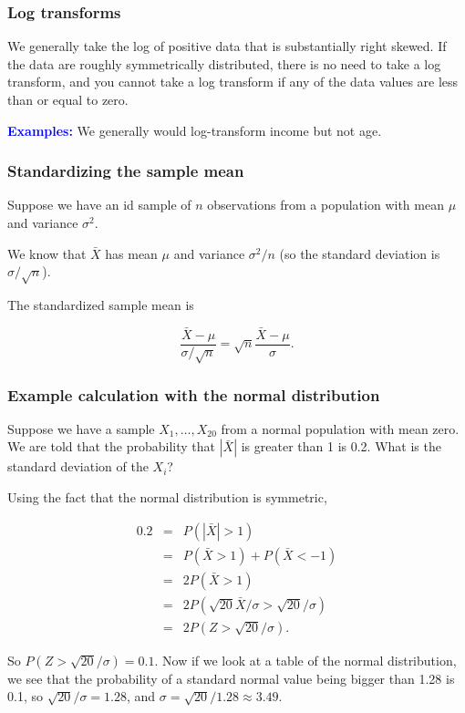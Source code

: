 \begin{frame}
\frametitle{Log transforms}

We generally take the log of positive data that is substantially right
skewed.  If the data are roughly symmetrically distributed, there is
no need to take a log transform, and you cannot take a log transform
if any of the data values are less than or equal to zero.

\textcolor{blue}{\bf Examples:} We generally would log-transform
income but not age.


\end{frame}



\begin{frame}
\frametitle{Standardizing the sample mean}

Suppose we have an id sample of $n$ observations from a population
with mean $\mu$ and variance $\sigma^2$.

We know that $\bar{X}$ has mean $\mu$ and variance $\sigma^2/n$ (so
the standard deviation is $\sigma/\sqrt{n}$).  

The standardized sample mean is

$$
\frac{\bar{X}-\mu}{\sigma/\sqrt{n}} = \sqrt{n}\frac{\bar{X}-\mu}{\sigma}.
$$

\end{frame}


\begin{frame}
\frametitle{Example calculation with the normal distribution}

Suppose we have a sample $X_1, \ldots, X_{20}$ from a normal
population with mean zero.  We are told that the probability that
$|\bar{X}|$ is greater than 1 is 0.2.  What is the standard deviation
of the $X_i$?

Using the fact that the normal distribution is symmetric,

\begin{eqnarray*}
0.2 &=& P(|\bar{X}| > 1)\\ &=& P(\bar{X}>1) + P(\bar{X}<-1)\\ &=&
2P(\bar{X}>1)\\ &=&
2P(\sqrt{20}\bar{X}/\sigma>\sqrt{20}/\sigma)\\ &=& 2P(Z >
\sqrt{20}/\sigma).
\end{eqnarray*}

So $P(Z > \sqrt{20}/\sigma) = 0.1$.  Now if we look at a table of the
normal distribution, we see that the probability of a standard normal
value being bigger than 1.28 is 0.1, so $\sqrt{20}/\sigma = 1.28$, and
$\sigma = \sqrt{20}/1.28 \approx 3.49$.

\end{frame}


